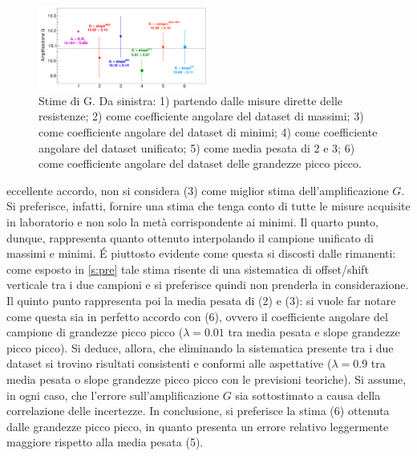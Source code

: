 \documentclass[a4paper,11pt]{article} %
\begin{document}
\begin{figure}
	\centering
	\includegraphics[width=0.5\textwidth]{../Plots/Report_Plots/opamp_comp_BIG.png}
	\caption{\footnotesize Stime di G. Da sinistra: 1) partendo dalle misure dirette delle resistenze; 2) come
	coefficiente angolare del dataset di massimi; 3) come coefficiente angolare del dataset di minimi; 4) come
	coefficiente angolare del dataset unificato; 5) come media pesata di 2 e 3; 6) come coefficiente angolare del
	dataset delle grandezze picco picco.}
	\label{i:opamp_comp}
\end{figure}

\noindent eccellente accordo, non si considera (3) come miglior stima dell'amplificazione $G$. Si preferisce, infatti,
fornire una stima che tenga conto di tutte le misure acquisite in laboratorio e non solo la metà corrispondente ai
minimi. Il quarto punto, dunque, rappresenta quanto ottenuto interpolando il campione unificato di massimi e minimi. É
piuttosto evidente come questa si discosti dalle rimanenti: come esposto in \autoref{s:pre} tale stima risente di una
sistematica di offset/shift verticale tra i due campioni e si preferisce quindi non prenderla in considerazione. Il
quinto punto rappresenta poi la media pesata di (2) e (3): si vuole far notare come questa sia in perfetto accordo con
(6), ovvero il coefficiente angolare del campione di grandezze picco picco ($\lambda=0.01$ tra media pesata e slope
grandezze picco picco). Si deduce, allora, che eliminando la sistematica presente tra i due dataset si trovino risultati
consistenti e conformi alle aspettative ($\lambda = 0.9$ tra media pesata o slope grandezze picco picco con le
previsioni teoriche). Si assume, in ogni caso, che l'errore sull'amplificazione $G$ sia sottostimato a causa della
correlazione delle incertezze. In conclusione, si preferisce la stima (6) ottenuta dalle grandezze picco picco, in
quanto presenta un errore relativo leggermente maggiore rispetto alla media pesata (5).


\end{document}
